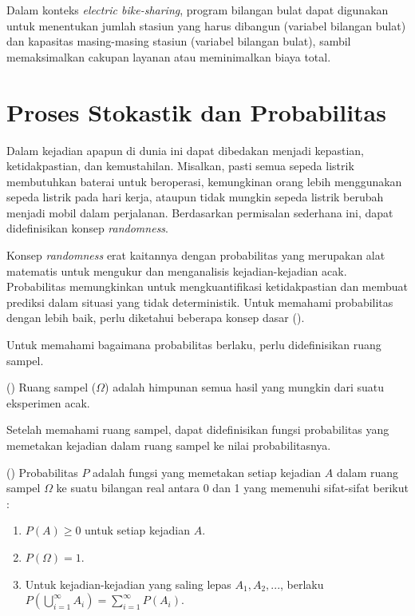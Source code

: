 Dalam konteks \textit{electric bike-sharing}, program bilangan bulat dapat digunakan untuk menentukan jumlah stasiun yang harus dibangun (variabel bilangan bulat) dan kapasitas masing-masing stasiun (variabel bilangan bulat), sambil memaksimalkan cakupan layanan atau meminimalkan biaya total.

\section{Proses Stokastik dan Probabilitas}
Dalam kejadian apapun di dunia ini dapat dibedakan menjadi kepastian, ketidakpastian, dan kemustahilan. Misalkan, pasti semua sepeda listrik membutuhkan baterai untuk beroperasi,  kemungkinan orang lebih menggunakan sepeda listrik pada hari kerja, ataupun tidak mungkin sepeda listrik berubah menjadi mobil dalam perjalanan. Berdasarkan permisalan sederhana ini, dapat didefinisikan konsep \textit{randomness}.

Konsep \textit{randomness} erat kaitannya dengan probabilitas yang merupakan alat matematis untuk mengukur dan menganalisis kejadian-kejadian acak. Probabilitas memungkinkan untuk mengkuantifikasi ketidakpastian dan membuat prediksi dalam situasi yang tidak deterministik. Untuk memahami probabilitas dengan lebih baik, perlu diketahui beberapa konsep dasar ().


Untuk memahami bagaimana probabilitas berlaku, perlu didefinisikan ruang sampel.

\begin{definisi}()
    Ruang sampel ($\Omega$) adalah himpunan semua hasil yang mungkin dari suatu eksperimen acak.
\end{definisi}

Setelah memahami ruang sampel, dapat didefinisikan fungsi probabilitas yang memetakan kejadian dalam ruang sampel ke nilai probabilitasnya.

\begin{definisi}
    () Probabilitas $P$ adalah fungsi yang memetakan setiap kejadian $A$ dalam ruang sampel $\Omega$ ke suatu bilangan real antara 0 dan 1 yang memenuhi sifat-sifat berikut :
    \begin{enumerate}
        \item $P(A) \geq 0$ untuk setiap kejadian $A$.
        \item $P(\Omega) = 1$.
        \item Untuk kejadian-kejadian yang saling lepas $A_1, A_2, ...$, berlaku $P(\bigcup_{i=1}^{\infty} A_i) = \sum_{i=1}^{\infty} P(A_i)$.
    \end{enumerate}
\end{definisi}

